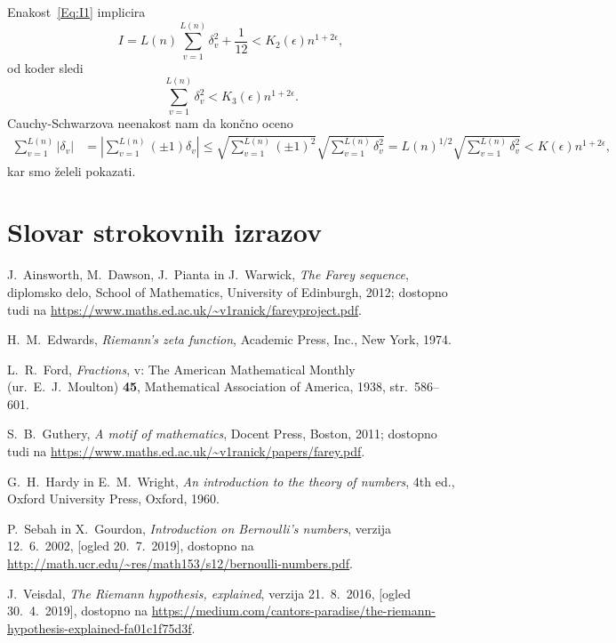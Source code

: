 \documentclass[mat1]{fmfdelo}
\begin{document}
Enakost~\eqref{Eq:I1} implicira
\[ I = L(n) \sum_{v=1}^{L(n)} \delta_{v}^2 + \frac{1}{12} < K_{2}(\epsilon) n^{1+2\epsilon}, \]
od koder sledi
\[ \sum_{v=1}^{L(n)} \delta_{v}^2 < K_{3}(\epsilon) n^{1+2\epsilon}. \]
Cauchy-Schwarzova neenakost nam da končno oceno
\begin{align*}
\sum_{v=1}^{L(n)} |\delta_{v}| &= \left| \sum_{v=1}^{L(n)} (\pm1)\delta_{v} \right|
	\leq \sqrt{\sum_{v=1}^{L(n)} (\pm1)^2}  \sqrt{\sum_{v=1}^{L(n)} \delta_{v}^2} 
	= L(n)^{1/2} \sqrt{\sum_{v=1}^{L(n)} \delta_{v}^2}
	< K(\epsilon) n^{1+2\epsilon},
\end{align*}
kar smo želeli pokazati.

%


\section*{Slovar strokovnih izrazov}

\geslo{}{}
\geslo{}{}

\begin{thebibliography}{99}

 J.~Ainsworth, M.~Dawson, J.~Pianta in J.~Warwick, \emph{The Farey sequence}, diplomsko delo, School of Mathematics, University of Edinburgh, 2012; dostopno tudi na \url{https://www.maths.ed.ac.uk/~v1ranick/fareyproject.pdf}.

 H.~M.~Edwards, \emph{Riemann's zeta function}, Academic Press, Inc., New York, 1974.

 L.~R.~Ford, \emph{Fractions}, v: The American Mathematical Monthly (ur.\ E.~J.~Moulton) \textbf{45}, Mathematical Association of America, 1938, str.\ 586--601.

 S.~B.~Guthery, \emph{A motif of mathematics}, Docent Press, Boston, 2011; dostopno tudi na \url{https://www.maths.ed.ac.uk/~v1ranick/papers/farey.pdf}.

 G.~H.~Hardy in E.~M.~Wright, \emph{An introduction to the theory of numbers}, 4th ed., Oxford University Press, Oxford, 1960.

 P.~Sebah in X.~Gourdon, \emph{Introduction on Bernoulli's numbers}, verzija 12.~6.~2002, [ogled 20.~7.~2019], dostopno na \url{http://math.ucr.edu/~res/math153/s12/bernoulli-numbers.pdf}.

 J.~Veisdal, \emph{The Riemann hypothesis, explained}, verzija 21.~8.~2016, [ogled 30.~4.~2019], dostopno na \url{https://medium.com/cantors-paradise/the-riemann-hypothesis-explained-fa01c1f75d3f}.

\end{thebibliography}
\end{document}
